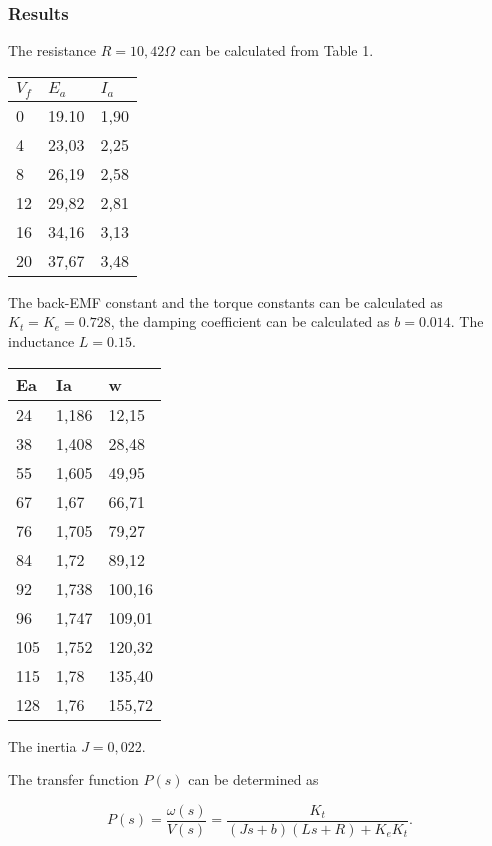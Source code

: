\subsubsection{Results}\label{results}

The resistance $R = 10,42\Omega$ can be calculated from Table 1.

\begin{longtable}[]{@{}lll@{}}
\toprule
$V_f$ & $E_a$ & $I_a$\tabularnewline
\midrule
\endhead
0 & 19.10 & 1,90\tabularnewline
4 & 23,03 & 2,25\tabularnewline
8 & 26,19 & 2,58\tabularnewline
12 & 29,82 & 2,81\tabularnewline
16 & 34,16 & 3,13\tabularnewline
20 & 37,67 & 3,48\tabularnewline
\bottomrule
\end{longtable}

The back-EMF constant and the torque constants can be calculated as
$K_t = K_e = 0.728$, the damping coefficient can be calculated as
$b = 0.014$. The inductance $L = 0.15$.

\begin{longtable}[]{@{}lll@{}}
\toprule
Ea & Ia & w\tabularnewline
\midrule
\endhead
24 & 1,186 & 12,15\tabularnewline
38 & 1,408 & 28,48\tabularnewline
55 & 1,605 & 49,95\tabularnewline
67 & 1,67 & 66,71\tabularnewline
76 & 1,705 & 79,27\tabularnewline
84 & 1,72 & 89,12\tabularnewline
92 & 1,738 & 100,16\tabularnewline
96 & 1,747 & 109,01\tabularnewline
105 & 1,752 & 120,32\tabularnewline
115 & 1,78 & 135,40\tabularnewline
128 & 1,76 & 155,72\tabularnewline
\bottomrule
\end{longtable}

The inertia $J = 0,022$.

The transfer function $P(s)$ can be determined as


 \begin{equation} 
P(s)=\frac{\omega(s)}{V(s)}=\frac{K_t}{(Js+b)(Ls+R)+K_eK_t}.
 \end{equation} 

